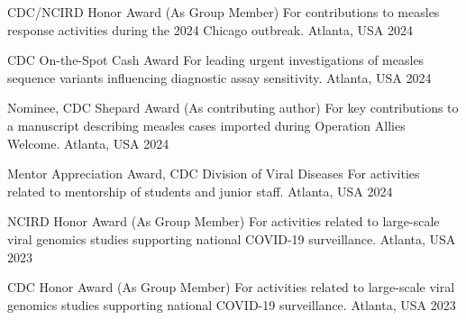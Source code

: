 



\begin{cvhonors}

  \cvhonor
    {CDC/NCIRD Honor Award (As Group Member)} %
    {For contributions to measles response activities during the 2024 Chicago outbreak.} %
    {Atlanta, USA} %
    {2024} %

  \cvhonor
    {CDC On-the-Spot Cash Award} %
    {For leading urgent investigations of measles sequence variants influencing diagnostic assay sensitivity.} %
    {Atlanta, USA} %
    {2024} %

  \cvhonor
    {Nominee, CDC Shepard Award (As contributing author)} %
    {For key contributions to a manuscript describing measles cases imported during Operation Allies Welcome.} %
    {Atlanta, USA} %
    {2024} %

  \cvhonor
    {Mentor Appreciation Award, CDC Division of Viral Diseases} %
    {For activities related to mentorship of students and junior staff.} %
    {Atlanta, USA} %
    {2024} %

  \cvhonor
    {NCIRD Honor Award (As Group Member)} %
    {For activities related to large-scale viral genomics studies supporting national COVID-19 surveillance.} %
    {Atlanta, USA} %
    {2023} %

  \cvhonor
    {CDC Honor Award (As Group Member)} %
    {For activities related to large-scale viral genomics studies supporting national COVID-19 surveillance.} %
    {Atlanta, USA} %
    {2023} %


\end{cvhonors}
